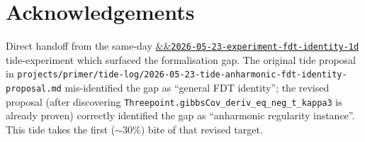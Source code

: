 \documentclass[11pt]{article}
\newcommand{\experimentref}[2][]{\href{https://therisensea.org/experiments/#2/}{\ifx&#1&\texttt{#2}\else#1\fi}}
\begin{document}
\section*{Acknowledgements}

Direct handoff from the same-day
\experimentref{2026-05-23-experiment-fdt-identity-1d} tide-experiment
which surfaced the formalisation gap. The original tide proposal
in \texttt{projects/primer/tide-log/2026-05-23-tide-anharmonic-fdt-identity-proposal.md}
mis-identified the gap as ``general FDT identity''; the revised
proposal (after discovering
\texttt{Threepoint.gibbsCov\_deriv\_eq\_neg\_t\_kappa3} is already
proven) correctly identified the gap as ``anharmonic regularity
instance''. This tide takes the first ($\sim 30\%$) bite of that
revised target.
\end{document}
